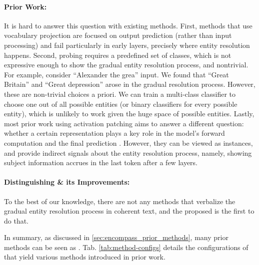 \documentclass{article}
\theoremstyle{plain}
\theoremstyle{definition}
\theoremstyle{remark}
\begin{document}
\paragraph{Prior Work:} It is hard to answer this question with existing methods. First, methods that use vocabulary projection are focused on output prediction (rather than input processing) and fail particularly in early layers, precisely where entity resolution happens.
Second, probing requires a predefined set of classes, which is not expressive enough to show the gradual entity resolution process, and nontrivial. For example, consider ``Alexander the grea'' input. We found that ``Great Britain'' and ``Great depression'' arose in the gradual resolution process. However, these are non-trivial choices a priori. We can train a multi-class classifier to choose one out of all possible entities (or binary classifiers for every possible entity), which is unlikely to work given the huge space of possible entities.
Lastly, most prior work using activation patching aims to answer a different question: whether a certain representation plays a key role in the model's forward computation and the final prediction \citep[e.g.,][]{meng2022locating, geva-etal-2023-dissecting}. However, they can be viewed as \methodName{} instances, and provide indirect signals about the entity resolution process, namely, showing subject information accrues in the last token after a few layers.

\paragraph{Distinguishing \methodName{} \& its Improvements:} To the best of our knowledge, there are not any methods that verbalize the gradual entity resolution process in coherent text, and the proposed \methodName{} is the first to do that.

In summary, as discussed in \ref{sec:encompass_prior_methods}, many prior methods can be seen as \methodNamePlural{}. Tab. \ref{tab:method-configs} details the configurations of \methodFamilyName{} that yield various methods introduced in prior work.
\end{document}

